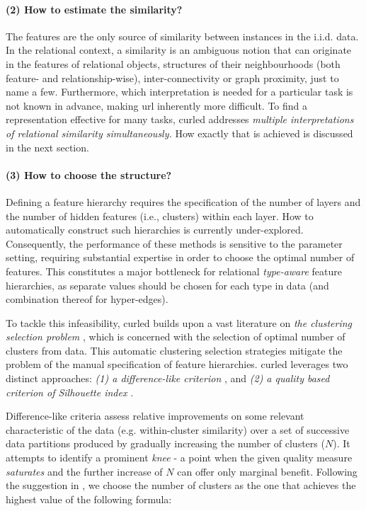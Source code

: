 \paragraph{(2) How to estimate the similarity?}
The features are the only source of similarity between instances in the i.i.d. data.
In the relational context, a similarity is an ambiguous notion that can originate in the  features of relational objects, structures of their neighbourhoods (both feature- and relationship-wise), inter-connectivity or graph proximity, just to name a few.
Furthermore, which interpretation is needed for a particular task is not known in advance, making \gls{url} inherently more difficult.
To find a representation effective for many tasks, \gls{curled} addresses \textit{multiple interpretations of relational similarity simultaneously.}
How exactly that is achieved is discussed in the next section.



\paragraph{(3) How to choose the structure?}
Defining a feature hierarchy requires the specification of the number of layers and the number of hidden features (i.e., clusters) within each layer.
How to automatically construct such hierarchies is currently under-explored.
Consequently, the performance of these methods is sensitive to the parameter setting, requiring substantial expertise in order to choose the optimal number of features.
This constitutes a major bottleneck for relational \textit{type-aware} feature hierarchies, as separate values should be chosen for each type in data (and combination thereof for hyper-edges).

To tackle this infeasibility, \gls{curled} builds upon a vast literature on \textit{the clustering selection problem} \cite{Arbelaitz:2013}, which is concerned with the selection of optimal number of clusters from data.
This automatic clustering selection strategies mitigate the problem of the manual specification of feature hierarchies.
\gls{curled} leverages  two distinct approaches: \textit{(1) a difference-like criterion} \cite{Vendramin:2010}, and \textit{(2) a quality based criterion of Silhouette index} \cite{Rousseeuw:1987}.


Difference-like criteria assess relative improvements on some relevant characteristic of the data (e.g. within-cluster similarity) over a set of successive data partitions produced by gradually increasing the number of clusters ($N$).
It attempts to identify a prominent \textit{knee} - a point when the given quality measure \textit{saturates} and the further increase of $N$ can offer only marginal benefit.
Following the suggestion in \cite{Vendramin:2010}, we choose the number of clusters as the one that achieves the highest value of the following formula:


